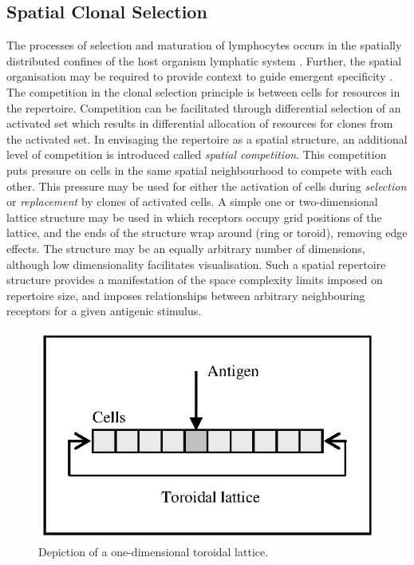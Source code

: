 \subsection{Spatial Clonal Selection}
The processes of selection and maturation of lymphocytes occurs in the spatially distributed confines of the host organism lymphatic system \cite{Anderson1990a}. Further, the spatial organisation may be required to provide context to guide emergent specificity \cite{Cohen2001a}. 
The competition in the clonal selection principle is between cells for resources in the repertoire. Competition can be facilitated through differential selection of an activated set which results in differential allocation of resources for clones from the activated set. In envisaging the repertoire as a spatial structure, an additional level of competition is introduced called \emph{spatial competition}. This competition puts pressure on cells in the same spatial neighbourhood to compete with each other. This pressure may be used for either the activation of cells during \emph{selection} or \emph{replacement} by clones of activated cells. A simple one or two-dimensional lattice structure may be used in which receptors occupy grid positions of the lattice, and the ends of the structure wrap around (ring or toroid), removing edge effects. The structure may be an equally arbitrary number of dimensions, although low dimensionality facilitates visualisation. Such a spatial repertoire structure provides a manifestation of the space complexity limits imposed on repertoire size, and imposes relationships between arbitrary neighbouring receptors for a given antigenic stimulus. 

\begin{figure}[ht]
	\centering
	\includegraphics[scale=0.85]{Cells/cells-spatial-oned-lattice}
	\caption{Depiction of a one-dimensional toroidal lattice.}
	\label{pic:cells:spatial:lattice}
\end{figure}

